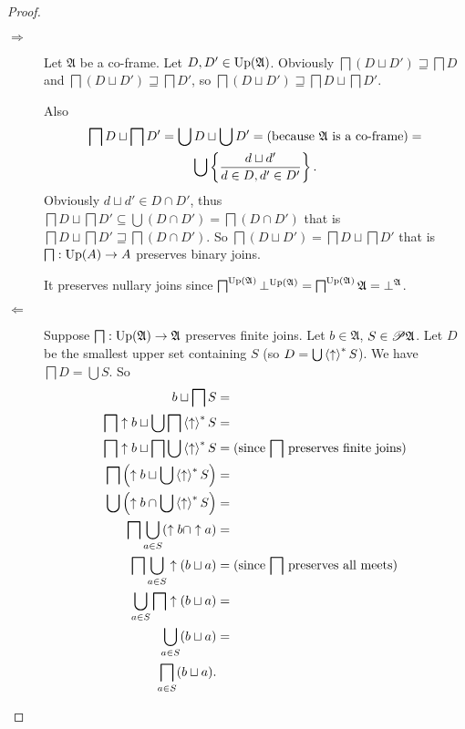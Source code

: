 \begin{proof}
~
\begin{description}
\item [{$\Rightarrow$}] Let $\mathfrak{A}$ be a co-frame. Let $D,D'\in\operatorname{Up}(\mathfrak{A})$.
Obviously $\bigsqcap(D\sqcup D')\sqsupseteq\bigsqcap D$ and $\bigsqcap(D\sqcup D')\sqsupseteq\bigsqcap D'$,
so $\bigsqcap(D\sqcup D')\sqsupseteq\bigsqcap D\sqcup\bigsqcap D'$.


Also 
\begin{multline*}
\bigsqcap D\sqcup\bigsqcap D'=\bigcup D\sqcup\bigcup D'=\text{(because \ensuremath{\mathfrak{A}} is a co-frame)}=\\
\bigcup\left\{ \frac{d\sqcup d'}{d\in D,d'\in D'}\right\}.
\end{multline*}
Obviously $d\sqcup d'\in D\cap D'$, thus $\bigsqcap D\sqcup\bigsqcap D'\subseteq\bigcup(D\cap D')=\bigsqcap(D\cap D')$
that is $\bigsqcap D\sqcup\bigsqcap D'\sqsupseteq\bigsqcap(D\cap D')$.
So $\bigsqcap(D\sqcup D')=\bigsqcap D\sqcup\bigsqcap D'$ that is
$\bigsqcap:\operatorname{Up}(A)\rightarrow A$ preserves binary joins.


It preserves nullary joins since $\bigsqcap^{\operatorname{Up}(\mathfrak{A})}\bot^{\operatorname{Up}(\mathfrak{A})}=\bigsqcap^{\operatorname{Up}(\mathfrak{A})}\mathfrak{A}=\bot^{\mathfrak{A}}$.

\item [{$\Leftarrow$}] Suppose $\bigsqcap:\operatorname{Up}(\mathfrak{A})\rightarrow\mathfrak{A}$
preserves finite joins. Let $b\in\mathfrak{A}$, $S\in\mathscr{P}\mathfrak{A}$.
Let $D$ be the smallest upper set containing $S$ (so $D=\bigcup\left\langle \uparrow\right\rangle ^{\ast}S$).
We have $\bigsqcap D=\bigcup S$. So 
\begin{align*}
b\sqcup\bigsqcap S & =\\
\bigsqcap\uparrow b\sqcup\bigcup\bigsqcap\left\langle \uparrow\right\rangle ^{\ast}S & =\\
\bigsqcap\uparrow b\sqcup\bigsqcap\bigcup\left\langle \uparrow\right\rangle ^{\ast}S & =\text{(since \ensuremath{\bigsqcap} preserves finite joins)}\\
\bigsqcap\left(\uparrow b\sqcup\bigcup\left\langle \uparrow\right\rangle ^{\ast}S\right) & =\\
\bigcup\left(\uparrow b\cap\bigcup\left\langle \uparrow\right\rangle ^{\ast}S\right) & =\\
\bigsqcap\bigcup_{a\in S}(\uparrow b\cap\uparrow a) & =\\
\bigsqcap\bigcup_{a\in S}\uparrow(b\sqcup a) & =\text{(since \ensuremath{\bigsqcap} preserves all meets)}\\
\bigcup_{a\in S}\bigsqcap\uparrow(b\sqcup a) & =\\
\bigcup_{a\in S}(b\sqcup a) & =\\
\bigsqcap_{a\in S}(b\sqcup a).
\end{align*}

\end{description}
\end{proof}
